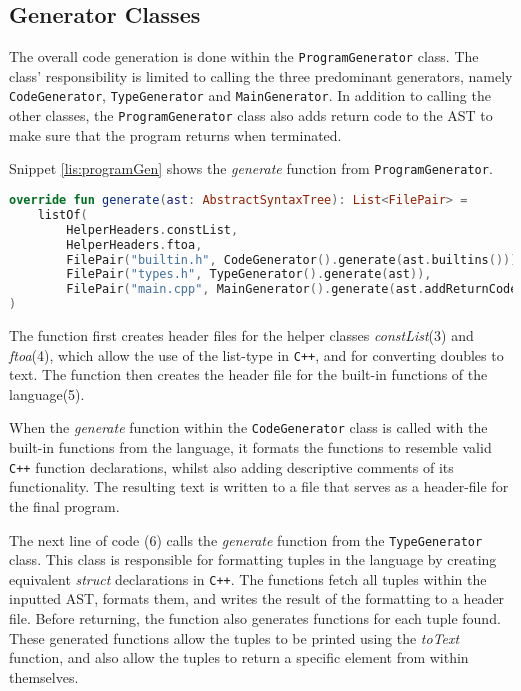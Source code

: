 \subsection{Generator Classes}
The overall code generation is done within the \texttt{ProgramGenerator} class.
The class' responsibility is limited to calling the three predominant generators, namely \texttt{CodeGenerator}, \texttt{TypeGenerator} and \texttt{MainGenerator}.
In addition to calling the other classes, the \texttt{ProgramGenerator} class also adds return code to the AST to make sure that the program returns when terminated.

Snippet \ref{lis:programGen} shows the \textit{generate} function from \texttt{ProgramGenerator}.

\begin{lstlisting}[language=Kotlin,label=lis:programGen,caption=The implementation of \textit{generate} in \texttt{ProgramGenerator}.]
override fun generate(ast: AbstractSyntaxTree): List<FilePair> = 
	listOf(
		HelperHeaders.constList,
		HelperHeaders.ftoa,
		FilePair("builtin.h", CodeGenerator().generate(ast.builtins())),
		FilePair("types.h", TypeGenerator().generate(ast)),
		FilePair("main.cpp", MainGenerator().generate(ast.addReturnCode().notBuiltins()))
)
\end{lstlisting}

The function first creates header files for the helper classes \textit{constList}(3) and \textit{ftoa}(4), which allow the use of the list-type in \texttt{C++}, and for converting doubles to text. 
The function then creates the header file for the built-in functions of the language(5).

When the \textit{generate} function within the \texttt{CodeGenerator} class is called with the built-in functions from the language, it formats the functions to resemble valid \texttt{C++} function declarations, whilst also adding descriptive comments of its functionality.
The resulting text is written to a file that serves as a header-file for the final program.

The next line of code (6) calls the \textit{generate} function from the \texttt{TypeGenerator} class.
This class is responsible for formatting tuples in the language by creating equivalent \textit{struct} declarations in \texttt{C++}.
The functions fetch all tuples within the inputted AST, formats them, and writes the result of the formatting to a header file.
Before returning, the function also generates functions for each tuple found.
These generated functions allow the tuples to be printed using the \textit{toText} function, and also allow the tuples to return a specific element from within themselves.

